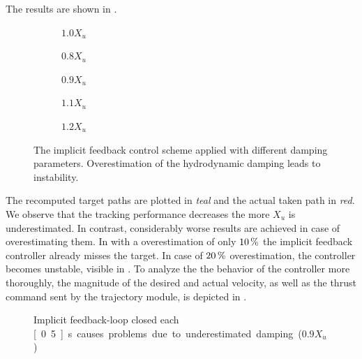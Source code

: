 The results are shown in .
\begin{figure}
	\centering
	\begin{subfigure}[t]{0.49\textwidth}
		\centering
		
		\caption{$1.0 X_u$}
	\end{subfigure}

	\begin{subfigure}[t]{0.49\textwidth}
		\centering
		
		\caption{$0.8 X_u$}
	\end{subfigure}
	\begin{subfigure}[t]{0.49\textwidth}
		\centering
		
		\caption{$0.9 X_u$}
	\end{subfigure}

	\begin{subfigure}[t]{0.49\textwidth}
		\centering
		
		\caption{$1.1 X_u$}
        \label{fig:slightly-overestimated-damping}
	\end{subfigure}
	\begin{subfigure}[t]{0.49\textwidth}
		\centering
		
		\caption{$1.2 X_u$}
        \label{fig:even-more-slightly-overestimated-damping}
	\end{subfigure}
	\caption{The implicit feedback control scheme applied with different damping parameters. Overestimation of the hydrodynamic damping leads to instability.}
    \label{fig:damping_analysis}
\end{figure}
The recomputed target paths are plotted in \textit{teal} and the actual taken path in \textit{red}.
We observe that the tracking performance decreases the more $X_u$ is underestimated. In contrast, considerably worse results are achieved in case of overestimating them. In  with a overestimation of only $\unit[10]{\%}$ the implicit feedback controller already misses the target. In case of $\unit[20]{\%}$ overestimation, the controller becomes unstable, visible in . To analyze the the behavior of the controller more thoroughly, the magnitude of the desired and actual velocity, as well as the thrust command sent by the trajectory module, is depicted in .
\begin{figure}
	
	\caption{Implicit feedback-loop closed each \unit[0.5]{s} causes problems due to underestimated damping ($0.9 X_{\dot{u}}$)}
	\label{fig:implicit_problem_velocity}
\end{figure}
